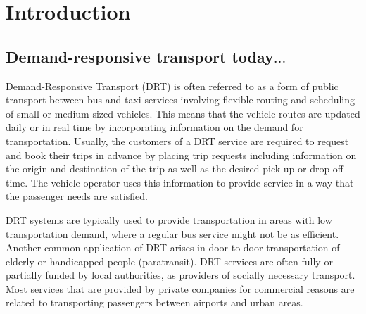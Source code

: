 \documentclass[dissertation,draft*]{aaltoseries}
\begin{document}
\tableofcontents

\listofpublications




\chapter{Introduction}
\section{Demand-responsive transport today$\ldots$}
Demand-Responsive Transport (DRT) is often referred to as a form of public transport between bus and taxi services involving 
flexible routing and scheduling of small or medium sized vehicles. 
This means that 
the vehicle routes are updated daily or in real time by incorporating information on
the demand for transportation. Usually, the customers of a DRT service are required to
request and book their trips in advance by placing trip requests including information
on the origin and destination of the trip as well as the desired pick-up or drop-off time.
The vehicle operator uses this information to provide service in a way that the passenger
needs are satisfied.


DRT systems are typically used to provide transportation in areas with low 
transportation demand, where a regular bus service might not be as efficient. 
Another common application of DRT arises in door-to-door transportation
of elderly or handicapped people (paratransit).
DRT services are often fully or partially funded by local 
authorities, as providers of socially necessary transport. 
Most services that are provided by private companies for commercial reasons
are related to transporting passengers between airports and urban areas.
\end{document}
